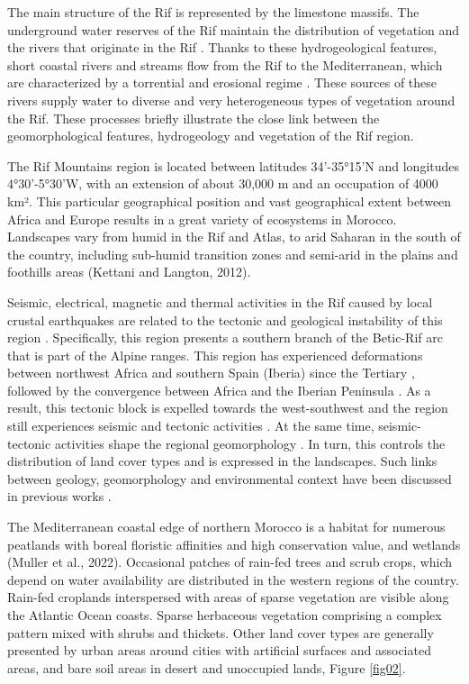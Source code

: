 \documentclass[geomatics,article,submit,pdftex,moreauthors]{Definitions/mdpi}
\begin{document}
The main structure of the Rif is represented by the limestone massifs. The underground water reserves of the Rif maintain the distribution of vegetation and the rivers that originate in the Rif \cite{Aqil03042015}. Thanks to these hydrogeological features, short coastal rivers and streams flow from the Rif to the Mediterranean, which are characterized by a torrential and erosional regime \cite{Zouhri01062004}. These sources of these rivers supply water to diverse and very heterogeneous types of vegetation around the Rif. These processes briefly illustrate the close link between the geomorphological features, hydrogeology and vegetation of the Rif region. 

The Rif Mountains region is located between latitudes 34'-35°15'N and longitudes 4°30'-5°30'W, with an extension of about 30,000 m and an occupation of 4000 km². This particular geographical position and vast geographical extent between Africa and Europe results in a great variety of ecosystems in Morocco. Landscapes vary from humid in the Rif and Atlas, to arid Saharan in the south of the country, including sub-humid transition zones and semi-arid in the plains and foothills areas (Kettani and Langton, 2012).

Seismic, electrical, magnetic and thermal activities in the Rif caused by local crustal earthquakes are related to the tectonic and geological instability of this region \cite{DUARTE2024104330}. Specifically, this region presents a southern branch of the Betic-Rif arc that is part of the Alpine ranges. This region has experienced deformations between northwest Africa and southern Spain (Iberia) since the Tertiary \cite{CHABLI2014123}, followed by the convergence between Africa and the Iberian Peninsula \cite{LGHAMOUR2024108941,KAIROUANI2024106762}. As a result, this tectonic block is expelled towards the west-southwest and the region still experiences seismic and tectonic activities \cite{MALUSA2024230533}. At the same time, seismic-tectonic activities shape the regional geomorphology \cite{SADKAOUI2024105219}. In turn, this controls the distribution of land cover types and is expressed in the landscapes. Such links between geology, geomorphology and environmental context have been discussed in previous works \cite{COSTA2024109578,BOUTAHAR2023104828,KAIROUANI2024106762}.

The Mediterranean coastal edge of northern Morocco is a habitat for numerous peatlands with boreal floristic affinities and high conservation value, and wetlands (Muller et al., 2022). Occasional patches of rain-fed trees and scrub crops, which depend on water availability are distributed in the western regions of the country. Rain-fed croplands interspersed with areas of sparse vegetation are visible along the Atlantic Ocean coasts. Sparse herbaceous vegetation comprising a complex pattern mixed with shrubs and thickets. Other land cover types are generally presented by urban areas around cities with artificial surfaces and associated areas, and bare soil areas in desert and unoccupied lands, Figure \ref{fig02}.
\end{document}
